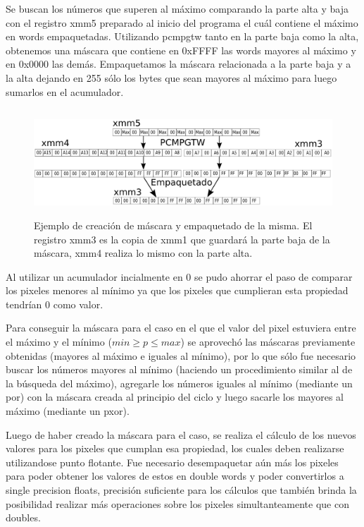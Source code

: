 Se buscan los números que superen al máximo comparando la parte alta y baja con el registro xmm5 preparado al inicio del programa el cuál contiene el máximo en words empaquetadas. Utilizando pcmpgtw tanto en la parte baja como la alta, obtenemos una máscara que contiene en 0xFFFF las words mayores al máximo y en 0x0000 las demás. Empaquetamos la máscara relacionada a la parte baja y a la alta dejando en 255 sólo los bytes que sean mayores al máximo para luego sumarlos en el acumulador.


\begin{figure}[H]
\centering
\includegraphics[width=150mm, height=40mm]{cpmmax.png}
\caption{Ejemplo de creación de máscara y empaquetado de la misma. El registro xmm3 es la copia de xmm1 que guardará la parte baja de la máscara, xmm4 realiza lo mismo con la parte alta.}
\label{overflow}
\end{figure}

Al utilizar un acumulador incialmente en 0 se pudo ahorrar el paso de comparar los pixeles menores al mínimo ya que los pixeles que cumplieran esta propiedad tendrían 0 como valor.

Para conseguir la máscara para el caso en el que el valor del pixel estuviera entre el máximo y el mínimo ($min \geq p \leq max$) se aprovechó las máscaras previamente obtenidas (mayores al máximo e iguales al mínimo), por lo que sólo fue necesario buscar los números mayores al mínimo (haciendo un procedimiento similar al de la búsqueda del máximo), agregarle los números iguales al mínimo (mediante un por) con la máscara creada al principio del ciclo y luego sacarle los mayores al máximo (mediante un pxor).

Luego de haber creado la máscara para el caso, se realiza el cálculo de los nuevos valores para los pixeles que cumplan esa propiedad, los cuales deben realizarse utilizandose punto flotante. Fue necesario desempaquetar aún más los pixeles para poder obtener los valores de estos en double words y poder convertirlos a single precision floats, precisión suficiente para los cálculos que también brinda la posibilidad realizar más operaciones sobre los pixeles simultanteamente que con doubles.

